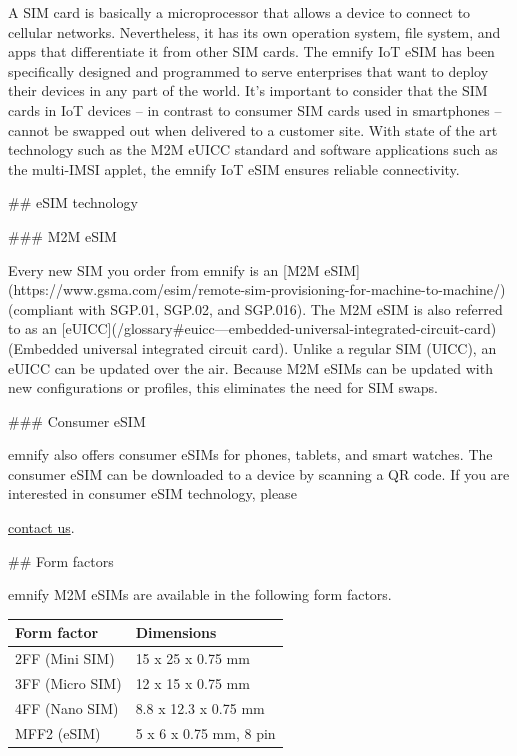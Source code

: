 \documentclass[11pt, oneside]{article}   	%
\begin{document}
\begin{markdown}

A SIM card is basically a microprocessor that allows a device to connect to cellular networks. Nevertheless, it has its own operation system, file system, and apps that differentiate it from other SIM cards. 
The emnify IoT eSIM has been specifically designed and programmed to serve enterprises that want to deploy their devices in any part of the world.
It's important to consider that the SIM cards in IoT devices -- in contrast to consumer SIM cards used in smartphones -- cannot be swapped out when delivered to a customer site. 
With state of the art technology such as the M2M eUICC standard and software applications such as the multi-IMSI applet, the emnify IoT eSIM ensures reliable connectivity. 

## eSIM technology

### M2M eSIM

Every new SIM you order from emnify is an [M2M eSIM](https://www.gsma.com/esim/remote-sim-provisioning-for-machine-to-machine/) (compliant with SGP.01, SGP.02, and SGP.016).
The M2M eSIM is also referred to as an [eUICC](/glossary#euicc---embedded-universal-integrated-circuit-card) (Embedded universal integrated circuit card).
Unlike a regular SIM (UICC), an eUICC can be updated over the air.
Because M2M eSIMs can be updated with new configurations or profiles, this eliminates the need for SIM swaps.

### Consumer eSIM

emnify also offers consumer eSIMs for phones, tablets, and smart watches.
The consumer eSIM can be downloaded to a device by scanning a QR code.
If you are interested in consumer eSIM technology, please 
\end{markdown}
\href{https://www.emnify.com/talk-to-us}{contact us}.

\pagebreak[4]

\begin{markdown}

## Form factors

\end{markdown}

emnify M2M eSIMs are available in the following form factors.

\begin{table}[H]
\begin{tabular}{|l|l|}
\hline
\textbf{Form factor} & \textbf{Dimensions} \\ \hline
2FF (Mini SIM) & 15 x 25 x 0.75 mm \\ \hline
3FF (Micro SIM) & 12 x 15 x 0.75 mm \\ \hline
4FF (Nano SIM) & 8.8 x 12.3 x 0.75 mm \\ \hline
MFF2 (eSIM) & 5 x 6 x 0.75 mm, 8 pin \\ \hline
\end{tabular}%
\end{table}
\end{document}
